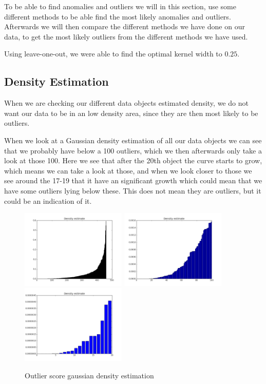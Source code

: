 To be able to find anomalies and outliers we will in this section, use some different methods to be able find the most likely anomalies and outliers. Afterwards we will then compare the different methods we have done on our data, to get the most likely outliers from the different methods we have used.

Using leave-one-out, we were able to find the optimal kernel width to $0.25$.

\subsection{Density Estimation}

When we are checking our different data objects estimated density, we do not want our data to be in an low density area, since they are then most likely to be outliers.

When we look at a Gaussian density estimation of all our data objects we can see that we probably have below a 100 outliers, which we then afterwards only take a look at those 100. Here we see that after the 20th object the curve starts to grow, which means we can take a look at those, and when we look closer to those we see around the 17-19 that it have an significant growth which could mean that we have some outliers lying below these. This does not mean they are outliers, but it could be an indication of it.

\begin{figure}[H]
\centering
\includegraphics[width=5cm, keepaspectratio=true]{pictures/densityEstimationAll.png}
\includegraphics[width=5cm, keepaspectratio=true]{pictures/densityEstimation100.png}
\includegraphics[width=5cm, keepaspectratio=true]{pictures/densityEstimation20.png}
\vspace{-0.4cm}
\caption{\footnotesize Outlier score gaussian density estimation}
\label{gkd}
\end{figure}

